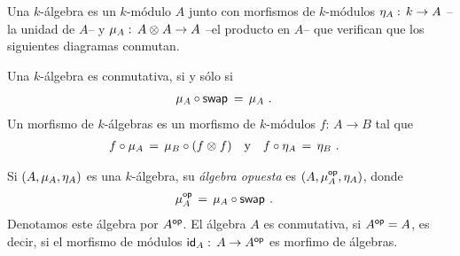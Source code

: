 \begin{defAlgebra}\label{def:algebraalternativa}
	Una $k$-\'{a}lgebra es un $k$-m\'{o}dulo $A$ junto con morfismos de
	$k$-m\'{o}dulos $\unidad[A]:\,k\rightarrow A$ --la unidad de $A$-- y
	$\producto[A]:\,A\tensor A\rightarrow A$ --el producto en $A$-- que
	verifican que los siguientes diagramas conmutan.
	\begin{center}
	\end{center}
	Una $k$-\'{a}lgebra es conmutativa, si y s\'{o}lo si
	\begin{align*}
		\producto[A]\circ\swap & \,=\,\producto[A]
		\text{ .}
	\end{align*}
	Un morfismo de $k$-\'{a}lgebras es un morfismo de $k$-m\'{o}dulos
	$f:\,A\rightarrow B$ tal que
	\begin{align*}
		f\circ\producto[A] \,=\,\producto[B]\circ (f\tensor f)
			& \quad\text{y}\quad
		f\circ\unidad[A] \,=\,\unidad[B]
		\text{ .}
	\end{align*}
\end{defAlgebra}

\begin{obsAlgebra}\label{obs:algebraopuesta}
	Si $(A,\producto[A],\unidad[A])$ es una $k$-\'{a}lgebra, su
	\emph{\'{a}lgebra opuesta} es $(A,\producto[A]^\opp,\unidad[A])$, donde
	\begin{align*}
		\producto[A]^\opp & \,=\,\producto[A]\circ\swap
		\text{ .}
	\end{align*}
	Denotamos este \'{a}lgebra por $A^\opp$. El \'{a}lgebra $A$ es
	conmutativa, si $A^\opp=A$, es decir, si el morfismo de m\'{o}dulos
	$\id[A]:\,A\rightarrow A^\opp$ es morfimo de \'{a}lgebras.
\end{obsAlgebra}

